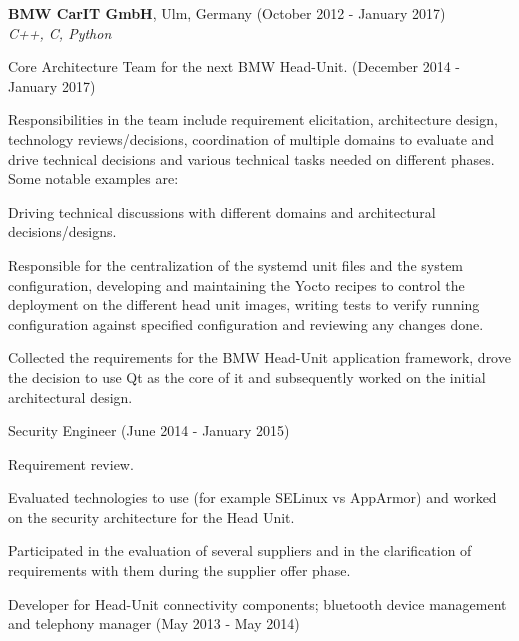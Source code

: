 \documentclass[alan.tex]{subfiles}
\begin{document}
  \item \textbf{BMW CarIT GmbH}, Ulm, Germany (October 2012 - January 2017)\\
    \emph{C++, C, Python}
    \begin{my_desc}
      \item[Core Architecture Team] for the next BMW Head-Unit. (December 2014 - January 2017)
        \begin{my_bullets}
          \item Responsibilities in the team include requirement elicitation, architecture design,
            technology reviews/decisions, coordination of multiple domains to evaluate and drive technical
            decisions and various technical tasks needed on different phases. Some notable examples are:
            \begin{my_bullets}
            \item Driving technical discussions with different domains and architectural decisions/designs.
            \item Responsible for the centralization of the systemd unit files and the system configuration,
              developing and maintaining the Yocto recipes to control the deployment on the different head
              unit images, writing tests to verify running configuration against specified configuration and
              reviewing any changes done.
            \item Collected the requirements for the BMW Head-Unit application framework, drove the decision
                to use Qt as the core of it and subsequently worked on the initial architectural design.
            \end{my_bullets}
        \end{my_bullets}
      \item[Security Engineer] (June 2014 - January 2015)
        \begin{my_bullets}
          \item Requirement review.
          \item Evaluated technologies to use (for example SELinux vs AppArmor) and worked on the security architecture
            for the Head Unit.
          \item Participated in the evaluation of several suppliers and in the clarification of requirements with
            them during the supplier offer phase.
        \end{my_bullets}
      \item[Developer] for Head-Unit connectivity components; bluetooth device management and telephony manager (May 2013 - May 2014)

\end{my_desc}
\end{document}
